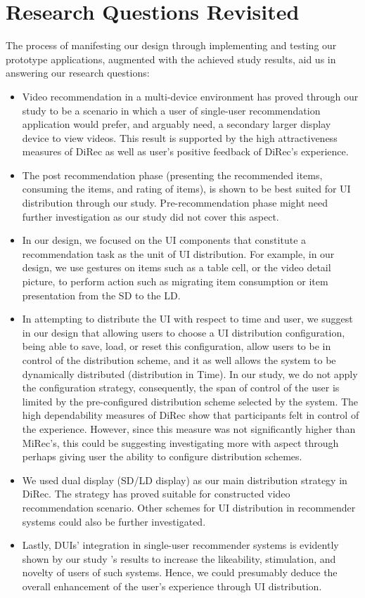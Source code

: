 \section{Research Questions Revisited} 
The process of manifesting our design through implementing and testing our
prototype applications, augmented with the achieved study results, aid us in
answering our research questions:
\begin{itemize}
  \item Video recommendation in a multi-device environment has proved through 
  our study to be a scenario in which a user of single-user recommendation
  application would prefer, and arguably need, a secondary larger display device
  to view videos. This result is supported by the high attractiveness measures
  of DiRec as well as user's positive feedback of DiRec's experience.
  \item The post recommendation phase (presenting the recommended items,
  consuming the items, and rating of items), is shown to be best suited for UI
  distribution through our study. Pre-recommendation phase might need further
  investigation as our study did not cover this aspect.
  \item In our design, we focused on the UI components that constitute a
  recommendation task as the unit of UI distribution. For example, in our
  design, we use gestures on items such as a table cell, or the video detail
  picture, to perform action such as migrating item consumption or item
  presentation from the SD to the LD.
  \item In attempting to distribute the UI with respect to time and user, we
  suggest in our design that allowing users to choose a UI distribution
  configuration, being able to save, load, or reset this configuration, allow
  users to be in control of the distribution scheme, and it as well allows the
  system to be dynamically distributed (distribution in Time). In our study, we
  do not apply the configuration strategy, consequently, the span of control of
  the user is limited by the pre-configured distribution scheme selected by the
  system. The high dependability measures of DiRec show that participants felt
  in control of the experience. However, since this measure was not
  significantly higher than MiRec's, this could be suggesting investigating more
  with aspect through perhaps giving user the ability to configure distribution
  schemes.
  \item We used dual display (SD/LD display) as our main distribution strategy
  in DiRec. The strategy has proved suitable for constructed video
  recommendation scenario. Other schemes for UI distribution in recommender
  systems could also be further investigated.
  \item Lastly, DUIs' integration in single-user recommender systems is
  evidently shown by our study 's results to increase the likeability,
  stimulation, and novelty of users of such systems. Hence, we could presumably
  deduce the overall enhancement of the user's experience through UI
  distribution.
\end{itemize}

